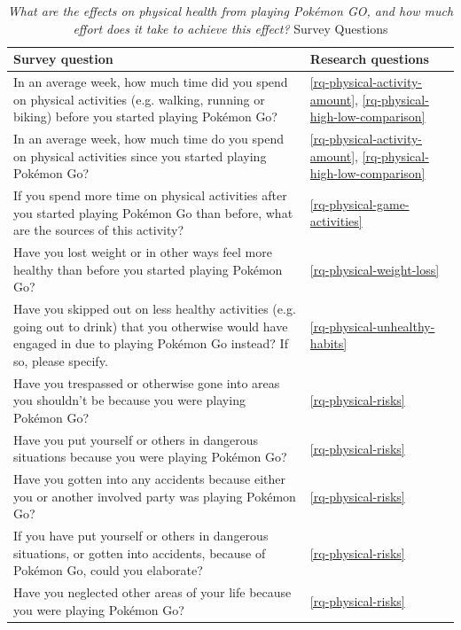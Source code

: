 \begin{table}[h]
	\caption{\emph{What are the effects on physical health from playing Pokémon GO, and how much effort does it take to achieve this effect?} Survey Questions}
	\centering
	\label{tbl:rg2-survey-questions}
	\begin{tabularx}{\textwidth}{|X|l|}
		\hline
		\textbf{Survey question} & \textbf{Research questions}\\
		\hline\hline
		
		In an average week, how much time did you spend on physical activities (e.g. walking, running or biking) before you started playing Pokémon Go? & \ref{rq-physical-activity-amount}, \ref{rq-physical-high-low-comparison}\\
		\hline
		
		In an average week, how much time do you spend on physical activities since you started playing Pokémon Go? & \ref{rq-physical-activity-amount}, \ref{rq-physical-high-low-comparison}\\
		\hline
		
		If you spend more time on physical activities after you started playing Pokémon Go than before, what are the sources of this activity? & \ref{rq-physical-game-activities}\\
		\hline
		
		Have you lost weight or in other ways feel more healthy than before you started playing Pokémon Go? & \ref{rq-physical-weight-loss}\\
		\hline
		
		Have you skipped out on less healthy activities (e.g. going out to drink) that you otherwise would have engaged in due to playing Pokémon Go instead? If so, please specify. & \ref{rq-physical-unhealthy-habits}\\
		\hline
		
		Have you trespassed or otherwise gone into areas you shouldn’t be because you were playing Pokémon Go? & \ref{rq-physical-risks}\\
		\hline
		
		Have you put yourself or others in dangerous situations because you were playing Pokémon Go? & \ref{rq-physical-risks}\\
		\hline
		
		Have you gotten into any accidents because either you or another involved party was playing Pokémon Go? & \ref{rq-physical-risks}\\
		\hline
		
		If you have put yourself or others in dangerous situations, or gotten into accidents, because of Pokémon Go, could you elaborate? & \ref{rq-physical-risks}\\
		\hline
		
		Have you neglected other areas of your life because you were playing Pokémon Go? & \ref{rq-physical-risks}\\
		\hline
	\end{tabularx}
\end{table}

